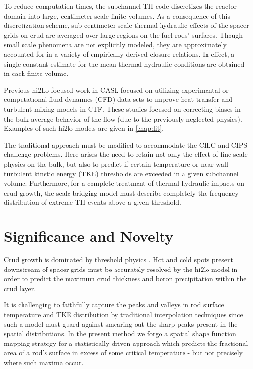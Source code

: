 To reduce computation times, the subchannel TH code discretizes the reactor
domain into large, centimeter scale finite volumes. As a consequence of this
discretization scheme, sub-centimeter scale thermal hydraulic effects of the
spacer grids on crud are averaged over large regions on the fuel rods'
surfaces.  Though small scale phenomena are not explicitly modeled, they are
approximately accounted for in a variety of empirically derived closure
relations.  In effect, a single constant estimate for the mean thermal
hydraulic conditions are obtained in each finite volume.
 

Previous hi2Lo focused work in CASL focused on utilizing experimental or computational fluid dynamics (CFD) data sets to improve heat transfer and turbulent mixing models in CTF.  These studies focused on
correcting biases in the bulk-average behavior of the flow (due to the
previously neglected physics).  Examples of such hi2lo models are given in
\autoref{chap:lit}.

The traditional approach must be modified to accommodate the CILC and CIPS
challenge problems.  Here arises the need to retain not only the effect of
fine-scale physics on the bulk, but also to predict if certain temperature or
near-wall turbulent kinetic energy (TKE) thresholds are exceeded in a given subchannel volume.  Furthermore, for a
complete treatment of thermal hydraulic impacts on crud growth, the
scale-bridging model must describe completely the frequency distribution of
extreme TH events above a given threshold.


\section{Significance and Novelty}

Crud growth is dominated by threshold physics \cite{mongoose17}.  Hot and cold spots
present downstream of spacer grids must be accurately resolved by the hi2lo model
in order to predict the maximum crud
thickness and boron precipitation within the crud layer.

It is challenging to faithfully capture the peaks and valleys in
rod surface temperature and TKE distribution by traditional interpolation
techniques since such a model must guard against smearing out the sharp peaks
present in the spatial distributions.
In the present method we forgo a spatial shape function mapping strategy
for a statistically driven approach which predicts the fractional
area of a rod's surface in excess of some critical temperature - but not
precisely where such maxima occur.

